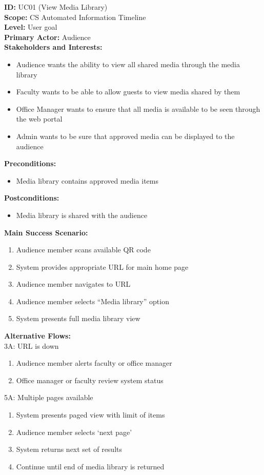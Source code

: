 \textbf{ID:} UC01 (View Media Library) \\
\textbf{Scope:} CS Automated Information Timeline \\
\textbf{Level:} User goal \\
\textbf{Primary Actor:} Audience \\
\textbf{Stakeholders and Interests:}
\begin{itemize}
    \item Audience wants the ability to view all shared media through the media library
    \item Faculty wants to be able to allow guests to view media shared by them
    \item Office Manager wants to ensure that all media is available to be seen through the web portal
    \item Admin wants to be sure that approved media can be displayed to the audience
\end{itemize}
\textbf{Preconditions:}
\begin{itemize}
    \item Media library contains approved media items
\end{itemize}
\textbf{Postconditions:}
\begin{itemize}
    \item Media library is shared with the audience
\end{itemize}
\textbf{Main Success Scenario:}
\begin{enumerate}
    \item Audience member scans available QR code
    \item System provides appropriate URL for main home page
    \item Audience member navigates to URL
    \item Audience member selects “Media library” option
    \item System presents full media library view
\end{enumerate}
\textbf{Alternative Flows:} \\
3A: URL is down
\begin{enumerate}
    \item Audience member alerts faculty or office manager
    \item Office manager or faculty review system status
\end{enumerate}
5A: Multiple pages available
\begin{enumerate}
    \item System presents paged view with limit of items
    \item Audience member selects `next page'
    \item System returns next set of results
    \item Continue until end of media library is returned
\end{enumerate}

